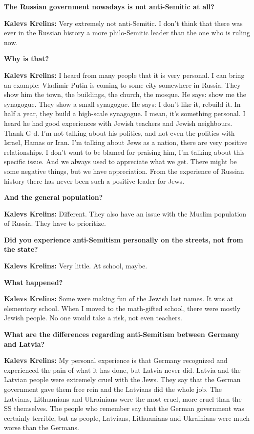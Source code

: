 \textbf{The Russian government nowadays is not anti-Semitic at all?} 

\textbf{Kalevs Krelins:} Very extremely not anti-Semitic. I don’t think that there was ever in the Russian history a more philo-Semitic leader than the one who is ruling now.  

\textbf{Why is that?} 
 
\textbf{Kalevs Krelins:} I heard from many people that it is very personal. I can bring an example: Vladimir Putin is coming to some city somewhere in Russia. They show him the town, the buildings, the church, the mosque. He says: show me the synagogue. They show a small synagogue. He says: I don’t like it, rebuild it. In half a year, they build a high-scale synagogue. I mean, it's something personal. I heard he had good experiences with Jewish teachers and Jewish neighbours. Thank G-d. I’m not talking about his politics, and not even the politics with Israel, Hamas or Iran. I’m talking about Jews as a nation, there are very positive relationships. I don’t want to be blamed for praising him, I’m talking about this specific issue. And we always used to appreciate what we get. There might be some negative things, but we have appreciation. From the experience of Russian history there has never been such a positive leader for Jews.    

\textbf{And the general population?} 

\textbf{Kalevs Krelins:} Different. They also have an issue with the Muslim population of Russia. They have to prioritize. 

\textbf{Did you experience anti-Semitism personally on the streets, not from the state?}  

\textbf{Kalevs Krelins:} Very little. At school, maybe.  

\textbf{What happened?} 

\textbf{Kalevs Krelins:} Some were making fun of the Jewish last names. It was at elementary school. When I moved to the math-gifted school, there were mostly Jewish people. No one would take a risk, not even teachers. 

\textbf{What are the differences regarding anti-Semitism between Germany and Latvia?}  

\textbf{Kalevs Krelins:} My personal experience is that Germany recognized and experienced the pain of what it has done, but Latvia never did. Latvia and the Latvian people were extremely cruel with the Jews. They say that the German government gave them free rein and the Latvians did the whole job. The Latvians, Lithuanians and Ukrainians were the most cruel, more cruel than the SS themselves. The people who remember say that the German government was certainly terrible, but as people, Latvians, Lithuanians and Ukrainians were much worse than the Germans.  

